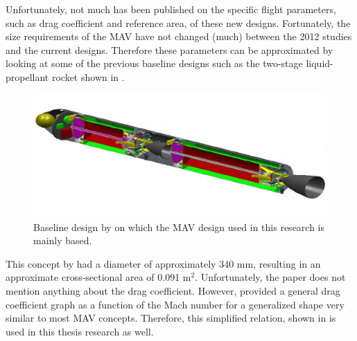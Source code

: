 





\noindent
Unfortunately, not much has been published on the specific flight parameters, such as drag coefficient and reference area, of these new designs. Fortunately, the size requirements of the \ac{MAV} have not changed (much) between the 2012 studies and the current designs. Therefore these parameters can be approximated by looking at some of the previous baseline designs such as the two-stage liquid-propellant rocket shown in . 


\begin{figure}[H]
\centering
\includegraphics[width=0.5 \textwidth]{figures/launcher_methods/baseline_liquid2_trinidad2012.jpg}
\caption{Baseline design by \cite{trinidad2012} on which the \ac{MAV} design used in this research is mainly based.}
\label{fig:baseline_liquid2_trinidad2012}
\end{figure}

\noindent
This concept by \cite{trinidad2012} had a diameter of approximately 340 mm, resulting in an approximate cross-sectional area of 0.091 m$^{2}$. Unfortunately, the paper does not mention anything about the drag coefficient. However, \cite{whitehead2004mars} provided a general drag coefficient graph as a function of the Mach number for a generalized shape very similar to most \ac{MAV} concepts. Therefore, this simplified relation, shown in  is used in this thesis research as well.

